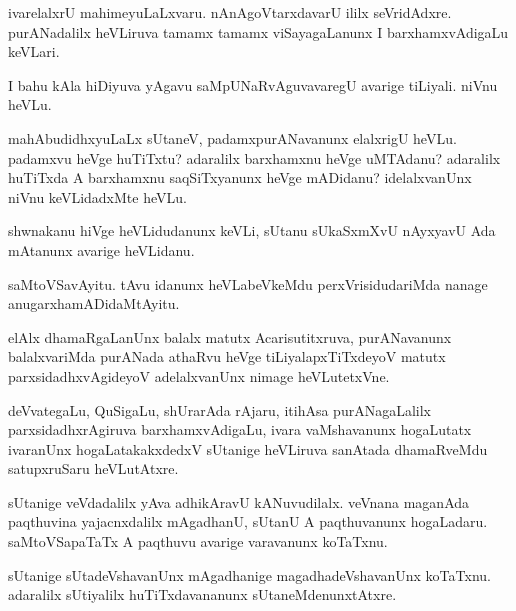 \documentclass{article}
\begin{document}
\begin{mn}
ivarelalxrU mahimeyuLaLxvaru. nAnAgoVtarxdavarU ililx
seVridAdxre. purANadalilx heVLiruva tamamx tamamx viSayagaLanunx I
barxhamxvAdigaLu keVLari.
\end{mn}

\begin{mn}
I bahu kAla hiDiyuva yAgavu saMpUNaRvAguvavaregU avarige
tiLiyali. niVnu heVLu.
\end{mn}

\begin{mn}
mahAbudidhxyuLaLx sUtaneV, padamxpurANavanunx elalxrigU
heVLu. padamxvu heVge huTiTxtu? adaralilx barxhamxnu heVge uMTAdanu?
adaralilx huTiTxda A barxhamxnu saqSiTxyanunx heVge mADidanu?
idelalxvanUnx niVnu keVLidadxMte heVLu.
\end{mn}

\begin{mn}
shwnakanu hiVge heVLidudanunx keVLi, sUtanu sUkaSxmXvU nAyxyavU Ada
mAtanunx avarige heVLidanu.
\end{mn}

\begin{mn}
saMtoVSavAyitu. tAvu idanunx heVLabeVkeMdu perxVrisidudariMda nanage anugarxhamADidaMtAyitu.
\end{mn}

\begin{mn}
elAlx dhamaRgaLanUnx balalx matutx Acarisutitxruva, purANavanunx
balalxvariMda purANada athaRvu heVge tiLiyalapxTiTxdeyoV matutx
parxsidadhxvAgideyoV adelalxvanUnx nimage heVLutetxVne.
\end{mn}

\begin{mn}%
deVvategaLu, QuSigaLu, shUrarAda rAjaru, itihAsa purANagaLalilx
parxsidadhxrAgiruva barxhamxvAdigaLu, ivara vaMshavanunx hogaLutatx
ivaranUnx hogaLatakakxdedxV sUtanige heVLiruva sanAtada dhamaRveMdu
satupxruSaru heVLutAtxre.
\end{mn}

\begin{mn}
sUtanige veVdadalilx yAva adhikAravU kANuvudilalx. veVnana maganAda
paqthuvina yajacnxdalilx mAgadhanU, sUtanU A paqthuvanunx
hogaLadaru. saMtoVSapaTaTx A paqthuvu avarige varavanunx koTaTxnu.
\end{mn}

\begin{mn}%
sUtanige sUtadeVshavanUnx mAgadhanige magadhadeVshavanUnx
koTaTxnu. adaralilx sUtiyalilx huTiTxdavananunx sUtaneMdenunxtAtxre.
\end{mn}
\end{document}
